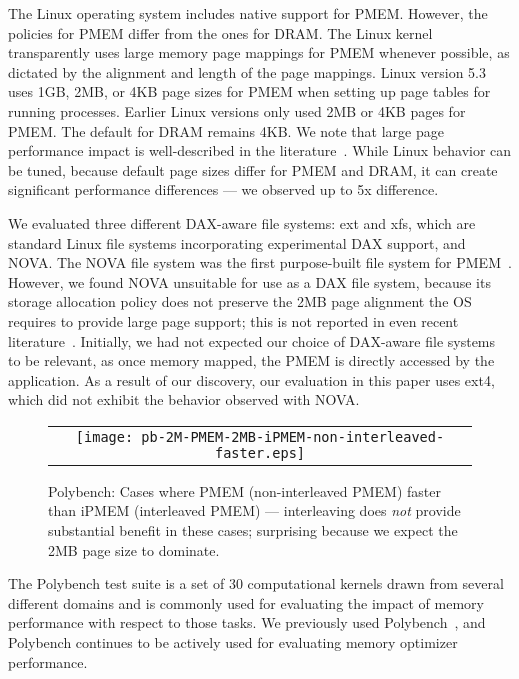 The Linux operating system includes native support for PMEM.  However, the policies for PMEM differ from the ones for DRAM. The Linux kernel transparently uses large memory page mappings for PMEM whenever possible, as dictated by the alignment and length of the page mappings.  Linux version 5.3 uses 1GB, 2MB, or 4KB page sizes for PMEM when setting up page tables for running processes.  Earlier Linux versions only used 2MB or 4KB pages for PMEM. The default for DRAM remains 4KB.  We note that large page performance impact is well-described in the literature~\cite{agarwal2017thermostat,panwar2018making}.  While Linux behavior can be tuned, because default page sizes differ for PMEM and DRAM, it can create significant performance differences --- we observed up to 5x difference.


We evaluated three different DAX-aware file systems: ext and xfs, which are standard Linux file systems incorporating experimental DAX support, and NOVA. The NOVA file system was the first purpose-built file system for PMEM~\cite{xu2016nova}.  However, we found NOVA unsuitable for use as a DAX file system, because its storage allocation policy does not preserve the 2MB page alignment the OS requires to provide large page support; this is not reported in even recent literature~\cite{izraelevitz2019basic,yang2019empirical}. Initially, we had not expected our choice of DAX-aware file systems to be relevant, as once memory mapped, the PMEM is directly accessed by the application.  As a result of our discovery, our evaluation in this paper uses ext4, which did not exhibit the behavior observed with NOVA.

\begin{figure}[!b]
  \captionsetup{justification=centering}
  \centering
  \caption{Polybench: Cases where PMEM (non-interleaved PMEM) faster than iPMEM (interleaved PMEM) --- interleaving does \textit{not} provide substantial benefit in these cases; surprising because we expect the 2MB page size to dominate.}
  \vspace{2mm}
  \label{fig:polybench:PMEM-vs-ipmem}
  \begin{tabular}{c}
    \texttt{[image: pb-2M-PMEM-2MB-iPMEM-non-interleaved-faster.eps]}
  \end{tabular}
\end{figure}



The Polybench test suite is a set of 30 computational kernels drawn from several different domains and is commonly used for evaluating the impact of memory performance with respect to those tasks. We previously used Polybench~\cite{doudali2017comerge}, and Polybench continues to be actively used for evaluating memory optimizer performance.



